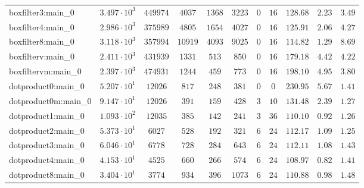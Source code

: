 \begin{tabular}{|l|c|c|c|c|c|c|c|c|c|c|}
boxfilter3:main\_0             & $ 3.497 \cdot 10^{3} $ & $ 449974   $ & $ 4037   $ & $ 1368   $ & $ 3223   $ & $ 0    $ & $ 16   $ & $ 128.68      $ & $ 2.23    $ & $ 3.49    $ \\
boxfilter4:main\_0             & $ 2.986 \cdot 10^{3} $ & $ 375989   $ & $ 4805   $ & $ 1654   $ & $ 4027   $ & $ 0    $ & $ 16   $ & $ 125.91      $ & $ 2.06    $ & $ 4.27    $ \\
boxfilter8:main\_0             & $ 3.118 \cdot 10^{3} $ & $ 357994   $ & $ 10919  $ & $ 4093   $ & $ 9025   $ & $ 0    $ & $ 16   $ & $ 114.82      $ & $ 1.29    $ & $ 8.69    $ \\
boxfilterv:main\_0             & $ 2.411 \cdot 10^{3} $ & $ 431939   $ & $ 1331   $ & $ 513    $ & $ 850    $ & $ 0    $ & $ 16   $ & $ 179.18      $ & $ 4.42    $ & $ 4.22    $ \\
boxfiltervm:main\_0            & $ 2.397 \cdot 10^{3} $ & $ 474931   $ & $ 1244   $ & $ 459    $ & $ 773    $ & $ 0    $ & $ 16   $ & $ 198.10      $ & $ 4.95    $ & $ 3.80    $ \\
dotproduct0:main\_0            & $ 5.207 \cdot 10^{1} $ & $ 12026    $ & $ 817    $ & $ 248    $ & $ 381    $ & $ 0    $ & $ 0    $ & $ 230.95      $ & $ 5.67    $ & $ 1.41    $ \\
dotproduct0m:main\_0           & $ 9.147 \cdot 10^{1} $ & $ 12026    $ & $ 391    $ & $ 159    $ & $ 428    $ & $ 3    $ & $ 10   $ & $ 131.48      $ & $ 2.39    $ & $ 1.27    $ \\
dotproduct1:main\_0            & $ 1.093 \cdot 10^{2} $ & $ 12035    $ & $ 385    $ & $ 142    $ & $ 241    $ & $ 3    $ & $ 36   $ & $ 110.10      $ & $ 0.92    $ & $ 1.26    $ \\
dotproduct2:main\_0            & $ 5.373 \cdot 10^{1} $ & $ 6027     $ & $ 528    $ & $ 192    $ & $ 321    $ & $ 6    $ & $ 24   $ & $ 112.17      $ & $ 1.09    $ & $ 1.25    $ \\
dotproduct3:main\_0            & $ 6.046 \cdot 10^{1} $ & $ 6778     $ & $ 728    $ & $ 284    $ & $ 643    $ & $ 6    $ & $ 24   $ & $ 112.11      $ & $ 1.08    $ & $ 1.43    $ \\
dotproduct4:main\_0            & $ 4.153 \cdot 10^{1} $ & $ 4525     $ & $ 660    $ & $ 266    $ & $ 574    $ & $ 6    $ & $ 24   $ & $ 108.97      $ & $ 0.82    $ & $ 1.41    $ \\
dotproduct8:main\_0            & $ 3.404 \cdot 10^{1} $ & $ 3774     $ & $ 934    $ & $ 396    $ & $ 1073   $ & $ 6    $ & $ 24   $ & $ 110.88      $ & $ 0.98    $ & $ 1.48    $ \\

\end{tabular}
